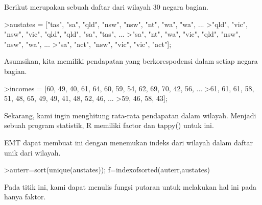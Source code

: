 \documentclass[a4paper,10pt]{article}
\begin{document}
\begin{eulernotebook}
\begin{eulercomment}
\begin{eulercomment}
\begin{eulercomment}
\begin{eulercomment}
\begin{eulercomment}
Berikut merupakan sebuah daftar dari wilayah 30 negara bagian.
\end{eulercomment}
\begin{eulerprompt}
>austates = ["tas", "sa", "qld", "nsw", "nsw", "nt", "wa", "wa", ...
>"qld", "vic", "nsw", "vic", "qld", "qld", "sa", "tas", ...
>"sa", "nt", "wa", "vic", "qld", "nsw", "nsw", "wa", ...
>"sa", "act", "nsw", "vic", "vic", "act"];
\end{eulerprompt}
\begin{eulercomment}
Asumsikan, kita memiliki pendapatan yang berkorespodensi dalam setiap
negara bagian.
\end{eulercomment}
\begin{eulerprompt}
>incomes = [60, 49, 40, 61, 64, 60, 59, 54, 62, 69, 70, 42, 56, ...
>61, 61, 61, 58, 51, 48, 65, 49, 49, 41, 48, 52, 46, ...
>59, 46, 58, 43];
\end{eulerprompt}
\begin{eulercomment}
Sekarang, kami ingin menghitung rata-rata pendapatan dalam wilayah.
Menjadi sebuah program statistik, R memiliki factor dan tappy() untuk
ini.

EMT dapat membuat ini dengan menemukan indeks dari wilayah dalam
daftar unik dari wilayah.
\end{eulercomment}
\begin{eulerprompt}
>auterr=sort(unique(austates)); f=indexofsorted(auterr,austates)
\end{eulerprompt}
\begin{euleroutput}
  [6,  5,  4,  2,  2,  3,  8,  8,  4,  7,  2,  7,  4,  4,  5,  6,  5,  3,
  8,  7,  4,  2,  2,  8,  5,  1,  2,  7,  7,  1]
\end{euleroutput}
\begin{eulercomment}
Pada titik ini, kami dapat menulis fungsi putaran untuk melakukan hal
ini pada hanya faktor.


\end{eulercomment}
\end{eulercomment}
\end{eulercomment}
\end{eulercomment}
\end{eulercomment}
\end{eulernotebook}
\end{document}

